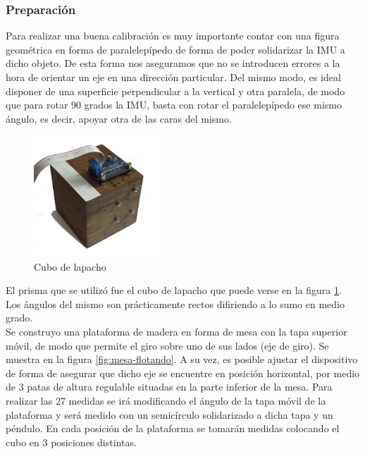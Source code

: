 \documentclass[main]{subfiles}
\begin{document}
\subsubsection*{Preparación}
Para realizar una buena calibración es muy importante contar con una figura geométrica en forma de paralelepípedo de forma de poder solidarizar la IMU a dicho objeto. De esta forma nos aseguramos que no se introducen errores a la hora de orientar un eje en una dirección particular. Del mismo modo, es ideal disponer de una superficie perpendicular a la vertical y otra paralela, de modo que para rotar 90 grados la IMU, basta con rotar el paralelepípedo ese mismo ángulo, es decir, apoyar otra de las caras del mismo. \\

\begin{figure}
  \vspace{-20pt}
  \begin{center}
    \includegraphics[width=0.42\textwidth]{./pics_acc/cubo.png}
  \end{center}
  \vspace{-20pt}
  \caption{Cubo de lapacho}
  \label{fig:cubo}
\end{figure}

El prisma que se utilizó fue el cubo de lapacho que puede verse en la figura \ref{fig:cubo}. \\
Los ángulos del mismo son prácticamente rectos difiriendo a lo sumo en medio grado. \\

Se construyo una plataforma de madera en forma de mesa con la tapa superior móvil, de modo que permite el giro sobre uno de sus lados (eje de giro). Se muestra en la figura \ref{fig:mesa-flotando}.  A su vez, es posible ajustar el dispositivo de forma de asegurar que dicho eje se encuentre en posición horizontal, por medio de 3 patas de altura regulable situadas en la parte inferior de la mesa. Para realizar las 27 medidas se irá modificando el ángulo de la tapa móvil de la plataforma y será medido con un semicírculo solidarizado a dicha tapa y un péndulo. En cada posición de la plataforma se tomarán medidas colocando el cubo en 3 posiciones distintas.
\end{document}
